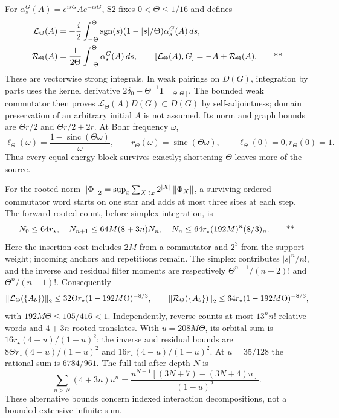 For $\alpha_s^G(A)=e^{isG}Ae^{-isG}$, S2 fixes $0<\Theta\le1/16$ and defines
\begin{align}
 \mathcal L_\Theta(A)&=-\frac i2\int_{-\Theta}^{\Theta}
 \operatorname{sgn}(s)(1-|s|/\Theta)\alpha_s^G(A)\,ds,\notag\\
 \mathcal R_\Theta(A)&=\frac1{2\Theta}\int_{-\Theta}^{\Theta}
 \alpha_s^G(A)\,ds,\qquad
 [\mathcal L_\Theta(A),G]=-A+\mathcal R_\Theta(A). \qquad\text{**}
 \label{recent:short-filter}
\end{align}
These are vectorwise strong integrals.  In weak pairings on $D(G)$, integration
by parts uses the kernel derivative
$2\delta_0-\Theta^{-1}\mathbf1_{[-\Theta,\Theta]}$.  The bounded weak
commutator then proves $\mathcal L_\Theta(A)D(G)\subset D(G)$ by self-adjointness;
domain preservation of an arbitrary initial $A$ is not assumed.  Its norm and
graph bounds are $\Theta r/2$ and $\Theta r/2+2r$.  At Bohr frequency $\omega$,
\begin{equation}
 \ell_\Theta(\omega)=\frac{1-\operatorname{sinc}(\Theta\omega)}{\omega},
 \qquad r_\Theta(\omega)=\operatorname{sinc}(\Theta\omega),
 \qquad \ell_\Theta(0)=0, r_\Theta(0)=1.
 \label{recent:sinc-multipliers}
\end{equation}
Thus every equal-energy block survives exactly; shortening $\Theta$ leaves more
of the source.

For the rooted norm
$\left\lVert \Phi\right\rVert_2=\sup_x\sum_{X\ni x}2^{|X|}\left\lVert \Phi_X\right\rVert$, a surviving ordered
commutator word starts on one star and adds at most three sites at each step.
The forward rooted count, before simplex integration, is
\begin{equation}
 N_0\le64r_\star,\quad N_{n+1}\le64M(8+3n)N_n,
 \quad N_n\le64r_\star(192M)^n(8/3)_n. \qquad\text{**}
 \label{recent:root-count}
\end{equation}
Here the insertion cost includes $2M$ from a commutator and $2^3$ from the
support weight; incoming anchors and repetitions remain.  The simplex contributes
$|s|^n/n!$, and the inverse and residual filter moments are respectively
$\Theta^{n+1}/(n+2)!$ and $\Theta^n/(n+1)!$.  Consequently
\begin{equation}
 \left\lVert \mathcal L_\Theta(\{A_b\})\right\rVert_2
 \le32\Theta r_\star(1-192M\Theta)^{-8/3},\qquad
 \left\lVert \mathcal R_\Theta(\{A_b\})\right\rVert_2
 \le64r_\star(1-192M\Theta)^{-8/3},
 \label{recent:s2-weighted}
\end{equation}
with $192M\Theta\le105/416<1$.  Independently, reverse counts at most
$13^nn!$ relative words and $4+3n$ rooted translates.  With $u=208M\Theta$,
its orbital sum is $16r_\star(4-u)/(1-u)^2$; the inverse and residual bounds
are $8\Theta r_\star(4-u)/(1-u)^2$ and $16r_\star(4-u)/(1-u)^2$.
At $u=35/128$ the rational sum is $6784/961$.  The full tail after depth $N$ is
\begin{equation}
 \sum_{n>N}(4+3n)u^n
 =\frac{u^{N+1}[(3N+7)-(3N+4)u]}{(1-u)^2}.
 \label{recent:s2-tail}
\end{equation}
These alternative bounds concern indexed interaction decompositions, not a
bounded extensive infinite sum.

